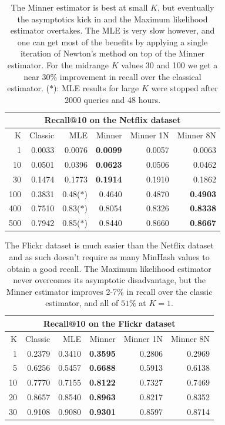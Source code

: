 \begin{table}
\centering
 \begin{tabular}{|r| r r r r r|} 
 \hline
     \multicolumn{6}{|c|}{Recall@10 on the Netflix dataset} \\
 \hline
 K  & Classic & MLE & Minner & Minner 1N & Minner 8N \\
 \hline
    1 & 0.0033 & 0.0076 & \textbf{ 0.0099} & 0.0057 & 0.0063 \\
  10 & 0.0501 & 0.0396 & \textbf{ 0.0623} & 0.0506 & 0.0462 \\
  30 & 0.1474 & 0.1773 & \textbf{ 0.1914} & 0.1910 & 0.1862 \\
  100 & 0.3831 & 0.48($\ast$)
  & 0.4640 & 0.4870 & \textbf{ 0.4903} \\
  400 & 0.7510 & 0.83($\ast$) & 0.8054 & 0.8326 & \textbf{ 0.8338} \\
  500 & 0.7942 & 0.85($\ast$) & 0.8440 & 0.8660 & \textbf{ 0.8667} \\
  \hline
 \end{tabular}
 \caption{The Minner estimator is best at small $K$, but eventually the asymptotics kick in and the Maximum likelihood estimator overtakes. The MLE is very slow however, and one can get most of the benefits by applying a single iteration of Newton's method on top of the Minner estimator.
    For the midrange $K$ values 30 and 100 we get a near 30\% improvement in recall over the classical estimator.
   ($\ast$): MLE results for large $K$ were stopped after 2000 queries and 48 hours.
 }
 \label{tab:netflix}
\end{table}

\begin{table}
\centering
 \begin{tabular}{|r| r r r r r|} 
 \hline
     \multicolumn{6}{|c|}{Recall@10 on the Flickr dataset} \\
 \hline
 K  & Classic & MLE & Minner & Minner 1N & Minner 8N \\
 \hline
    1 & 0.2379 & 0.3410 & \textbf{ 0.3595} & 0.2806 & 0.2969 \\
   5 & 0.6256 & 0.5457 & \textbf{ 0.6688} & 0.5913 & 0.6138 \\
  10 & 0.7770 & 0.7155 & \textbf{ 0.8122} & 0.7327 & 0.7469 \\
  20 & 0.8657 & 0.8540 & \textbf{ 0.8963} & 0.8217 & 0.8352 \\
  30 & 0.9108 & 0.9080 & \textbf{ 0.9301} & 0.8597 & 0.8714 \\
  \hline
 \end{tabular}
 \caption{The Flickr dataset is much easier than the Netflix dataset and as such doesn't require as many MinHash values to obtain a good recall. The Maximum likelihood estimator never overcomes its asymptotic disadvantage, but the Minner estimator improves 2-7\% in recall over the classic estimator, and all of $51\%$ at $K=1$.}
 \label{tab:flickr}
\end{table}


